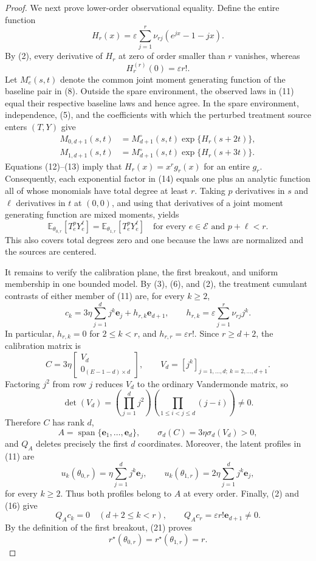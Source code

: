 \documentclass{article}
\begin{document}
\begin{proof}
We next prove lower-order observational equality.  Define the entire function
\[
 H_r(x)=\varepsilon\sum_{j=1}^{r}\nu_{rj}(e^{jx}-1-jx).
 \tag{12}
\]
By (2), every derivative of \(H_r\) at zero of order smaller than \(r\) vanishes, whereas
\[
 H_r^{(r)}(0)=\varepsilon r!.
 \tag{13}
\]
Let \(M_e^\circ(s,t)\) denote the common joint moment generating function of the baseline pair in (8).  Outside the spare environment, the observed laws in (11) equal their respective baseline laws and hence agree.  In the spare environment, independence, (5), and the coefficients with which the perturbed treatment source enters \((T,Y)\) give
\[
 \begin{aligned}
 M_{0,d+1}(s,t)&=M_{d+1}^\circ(s,t)\exp\{H_r(s+2t)\},\\
 M_{1,d+1}(s,t)&=M_{d+1}^\circ(s,t)\exp\{H_r(s+3t)\}.
 \end{aligned}
 \tag{14}
\]
Equations (12)--(13) imply that \(H_r(x)=x^rg_r(x)\) for an entire \(g_r\).  Consequently, each exponential factor in (14) equals one plus an analytic function all of whose monomials have total degree at least \(r\).  Taking \(p\) derivatives in \(s\) and \(\ell\) derivatives in \(t\) at \((0,0)\), and using that derivatives of a joint moment generating function are mixed moments, yields
\[
 \mathbb E_{\theta_{0,r}}[T_e^pY_e^\ell]
 =\mathbb E_{\theta_{1,r}}[T_e^pY_e^\ell]
 \quad
 \text{for every }e\in\mathcal E\text{ and }p+\ell<r.
 \tag{15}
\]
This also covers total degrees zero and one because the laws are normalized and the sources are centered.

It remains to verify the calibration plane, the first breakout, and uniform membership in one bounded model.  By (3), (6), and (2), the treatment cumulant contrasts of either member of (11) are, for every \(k\geq2\),
\[
 c_k
 =3\eta\sum_{j=1}^{d}j^k\mathbf e_j
  +h_{r,k}\mathbf e_{d+1},
 \qquad
 h_{r,k}=\varepsilon\sum_{j=1}^{r}\nu_{rj}j^k.
 \tag{16}
\]
In particular, \(h_{r,k}=0\) for \(2\leq k<r\), and \(h_{r,r}=\varepsilon r!\).  Since \(r\geq d+2\), the calibration matrix is
\[
 C=3\eta
 \begin{bmatrix}
 V_d\\
 0_{(E-1-d)\times d}
 \end{bmatrix},
 \qquad
 V_d=[j^k]_{j=1,\ldots,d;\ k=2,\ldots,d+1}.
 \tag{17}
\]
Factoring \(j^2\) from row \(j\) reduces \(V_d\) to the ordinary Vandermonde matrix, so
\[
 \det(V_d)=
 \left(\prod_{j=1}^{d}j^2\right)
 \left(\prod_{1\leq i<j\leq d}(j-i)\right)\neq0.
 \tag{18}
\]
Therefore \(C\) has rank \(d\),
\[
 A=\operatorname{span}\{\mathbf e_1,\ldots,\mathbf e_d\},
 \qquad
 \sigma_d(C)=3\eta\sigma_d(V_d)>0,
 \tag{19}
\]
and \(Q_A\) deletes precisely the first \(d\) coordinates.  Moreover, the latent profiles in (11) are
\[
 u_k(\theta_{0,r})=\eta\sum_{j=1}^{d}j^k\mathbf e_j,
 \qquad
 u_k(\theta_{1,r})=2\eta\sum_{j=1}^{d}j^k\mathbf e_j,
 \tag{20}
\]
for every \(k\geq2\).  Thus both profiles belong to \(A\) at every order.  Finally, (2) and (16) give
\[
 Q_Ac_k=0\quad(d+2\leq k<r),
 \qquad
 Q_Ac_r=\varepsilon r!\mathbf e_{d+1}\neq0.
 \tag{21}
\]
By the definition of the first breakout, (21) proves
\[
 r^\star(\theta_{0,r})=r^\star(\theta_{1,r})=r.
 \tag{22}
\]


\end{proof}
\end{document}
